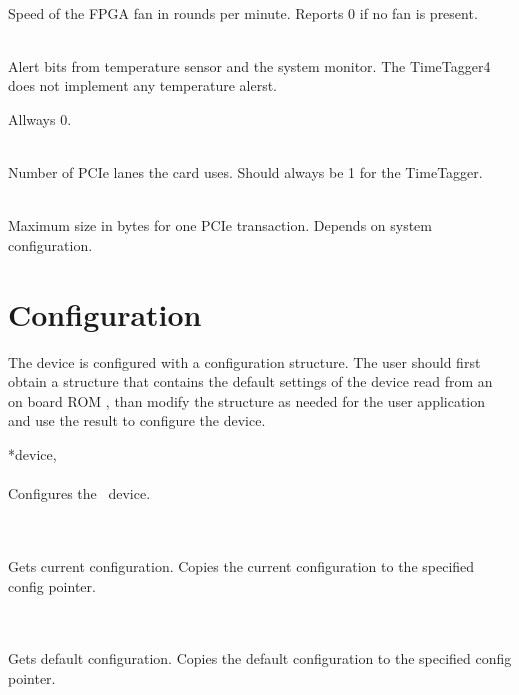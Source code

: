 			\\
			Speed of the FPGA fan in rounds per minute. Reports 0 if no fan is present.\par

			\\
			Alert bits from temperature sensor and the system monitor.
			The TimeTagger4 does not implement any temperature alerst.

			\par
			Allways 0. 

			\\
			Number of PCIe lanes the card uses. Should always be 1 for the TimeTagger. \par

			\\
			Maximum size in bytes for one PCIe transaction. Depends on system configuration.\par

	\section{Configuration}

		The device is configured with a configuration structure. The user should first obtain a structure that contains the default settings of the device read from an on board ROM , than modify the structure as needed for the user application and use the result to configure the device.\par

		 {*device,} \\ \\
		Configures the \deviceName\ device.\par

		 \\ \\
		Gets current configuration. Copies the current configuration to the specified config pointer.\par

		 \\ \\
		Gets default configuration. Copies the default configuration to the specified config pointer.\par

